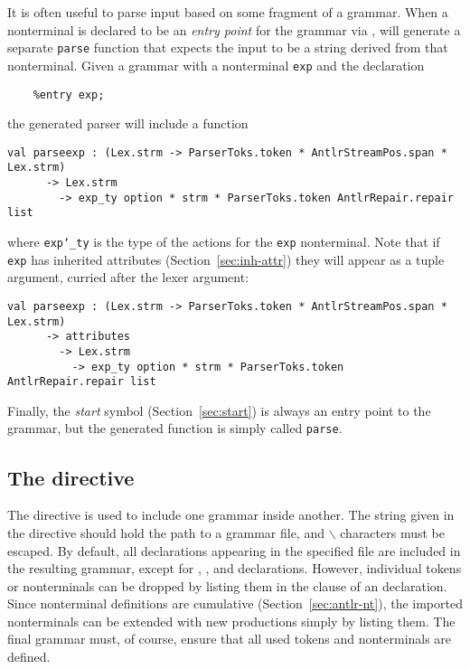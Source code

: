 It is often useful to parse input based on some fragment of a grammar.  When a nonterminal is declared to be an \emph{entry point} for the grammar via , \antlr{} will generate a separate \texttt{parse} function that expects the input to be a string derived from that nonterminal.  Given a grammar with a nonterminal \texttt{exp} and the declaration
\begin{verbatim}
    %entry exp;
\end{verbatim}
the generated parser will include a function
\begin{lstlisting}
val parseexp : (Lex.strm -> ParserToks.token * AntlrStreamPos.span * Lex.strm)
      -> Lex.strm
        -> exp_ty option * strm * ParserToks.token AntlrRepair.repair list
\end{lstlisting}
where \texttt{exp\char`\_ty} is the type of the actions for the \texttt{exp} nonterminal.  Note that if \texttt{exp} has inherited attributes (Section~\ref{sec:inh-attr}) they will appear as a tuple argument, curried after the lexer argument:
\begin{lstlisting}
val parseexp : (Lex.strm -> ParserToks.token * AntlrStreamPos.span * Lex.strm)
      -> attributes
        -> Lex.strm
          -> exp_ty option * strm * ParserToks.token AntlrRepair.repair list
\end{lstlisting}
Finally, the \emph{start} symbol (Section~\ref{sec:start}) is always an entry point to the grammar, but the generated function is simply called \texttt{parse}.

\subsection{The  directive}

The  directive is used to include one grammar inside another.  The string given in the directive should hold the path to a grammar file, and $\backslash$ characters must be escaped.  By default, all declarations appearing in the specified file are included in the resulting grammar, except for , , and  declarations.  However, individual tokens or nonterminals can be dropped by listing them in the  clause of an  declaration.  Since nonterminal definitions are cumulative (Section~\ref{sec:antlr-nt}), the imported nonterminals can be extended with new productions simply by listing them.
The final grammar must, of course, ensure that all used tokens and nonterminals are defined.

